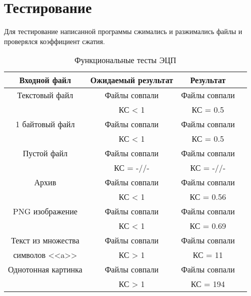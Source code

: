 \section{Тестирование}

Для тестирование написанной программы сжимались и разжимались файлы и проверялся коэффициент сжатия.

\begin{table}[h]
	\begin{center}
		\begin{threeparttable}
			\captionsetup{justification=raggedright,singlelinecheck=off}
			\caption{\label{tbl:functional_RSA} Функциональные тесты ЭЦП}
			\begin{tabular}{|c|c|c|c|}
				\hline
				Входной файл & Ожидаемый результат & Результат \\ 
				\hline
				Текстовый файл & Файлы совпали & Файлы совпали\\
				 & КС < 1 & КС = 0.5 \\
				\hline
				1 байтовый файл & Файлы совпали & Файлы совпали\\
				& КС < 1 & КС = 0.5 \\
				\hline
				Пустой файл & Файлы совпали & Файлы совпали\\
				& КС = -//- & КС = -//- \\
				\hline
				Архив & Файлы совпали & Файлы совпали\\
				& КС < 1 & КС = 0.56 \\
				\hline
				PNG изображение & Файлы совпали & Файлы совпали\\
				& КС < 1 & КС = 0.69 \\
				\hline
				Текст из множества & Файлы совпали & Файлы совпали\\
				символов <<a>> & КС > 1 & КС = 11 \\
				\hline
				Однотонная картинка & Файлы совпали & Файлы совпали\\
				& КС > 1 & КС = 194 \\
				\hline
			\end{tabular}
		\end{threeparttable}
	\end{center}
\end{table}
\FloatBarrier
